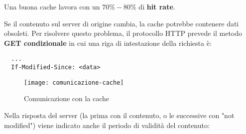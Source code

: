 \documentclass[a4paper]{article}
\begin{document}
\vspace{1em}
\noindent
Una buona cache lavora con un \( 70\%-80\% \) di \textbf{hit rate}. 

Se il contenuto sul server di origine cambia, la cache potrebbe contenere dati obsoleti.
Per risolvere questo problema, il protocollo HTTP prevede il metodo \textbf{GET condizionale}
in cui una riga di intestazione della richiesta è:
\begin{lstlisting}
  ...
  If-Modified-Since: <data>
\end{lstlisting}
\begin{figure}[H]
  \centering
  \texttt{[image: comunicazione-cache]}
  \caption{Comunicazione con la cache}
\end{figure}
\noindent
Nella risposta del server (la prima con il contenuto, o le successive con "not modified")
viene indicato anche il periodo di validità del contenuto:
\end{document}
